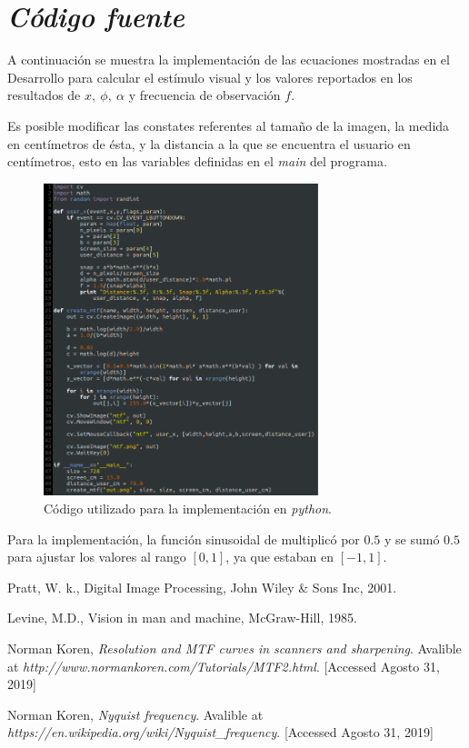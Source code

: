 \documentclass[conference]{IEEEtran}
\begin{document}
\section{\textit{Código fuente}}

A continuación se muestra la implementación de las ecuaciones mostradas en el Desarrollo para calcular el estímulo visual y los valores reportados en los resultados de $x,\ \phi,\ \alpha$ y frecuencia de observación $f$.

Es posible modificar las constates referentes al tamaño de la imagen, la medida en centímetros de ésta, y la distancia a la que se encuentra el usuario en centímetros, esto en las variables definidas en el \textit{main} del programa.


\begin{figure}[htbp]
\centerline{\includegraphics[width=80mm]{code/code1}}
\caption{Código utilizado para la implementación en \textit{python}.}
\label{code1}
\end{figure}

Para la implementación, la función sinusoidal de multiplicó por $0.5$ y se sumó $0.5$ para ajustar los valores al rango  $[0,1]$, ya que estaban en $[-1,1]$.


\begin{thebibliography}{00}
 Pratt, W. k., Digital Image Processing, John Wiley \& Sons Inc, 2001.

 Levine, M.D., Vision in man and machine, McGraw-Hill, 1985.

 Norman Koren, \textit{Resolution and MTF curves in scanners and sharpening}. Avalible at \textit{http://www.normankoren.com/Tutorials/MTF2.html}. [Accessed Agosto 31, 2019]

 Norman Koren, \textit{Nyquist frequency}. Avalible at \textit{https://en.wikipedia.org/wiki/Nyquist\_frequency}. [Accessed Agosto 31, 2019]
\end{thebibliography}







\end{document}
